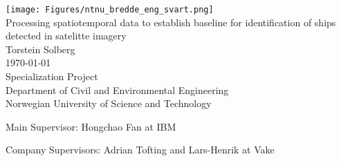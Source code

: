 \thispagestyle{empty}
\texttt{[image: Figures/ntnu\_bredde\_eng\_svart.png]}
\mbox{}\\[6pc]

\Huge{Processing spatiotemporal data to establish baseline for identification of ships detected in satelitte imagery }\\[2pc]

\Large{Torstein Solberg}\\[1pc]
\large{\monthyeardate\today}\\[2pc]

Specialization Project\\
Department of Civil and Environmental Engineering\\
Norwegian University of Science and Technology






\vfill

\noindent Main Supervisor: Hongchao Fan at IBM

\noindent Company Supervisors: Adrian Tofting and Lars-Henrik at Vake

